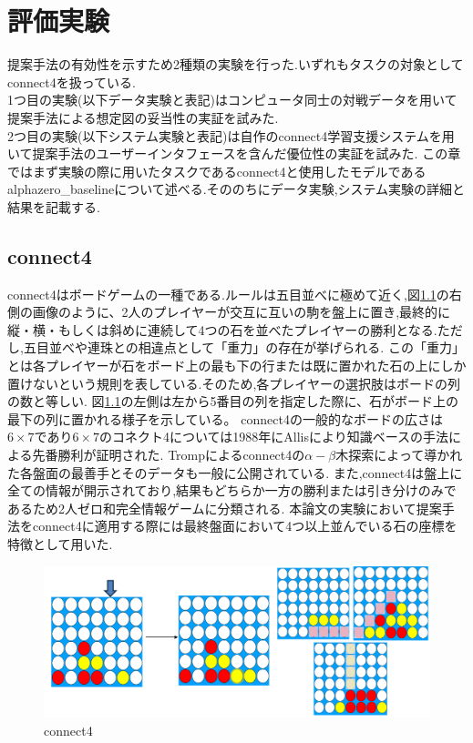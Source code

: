 \chapter{評価実験}
提案手法の有効性を示すため2種類の実験を行った.いずれもタスクの対象としてconnect4を扱っている.\\
1つ目の実験(以下データ実験と表記)はコンピュータ同士の対戦データを用いて提案手法による想定図の妥当性の実証を試みた.\\
2つ目の実験(以下システム実験と表記)は自作のconnect4学習支援システムを用いて提案手法のユーザーインタフェースを含んだ優位性の実証を試みた.
この章ではまず実験の際に用いたタスクであるconnect4と使用したモデルであるalphazero\_baselineについて述べる.そののちにデータ実験,システム実験の詳細と結果を記載する.
\section{connect4}
connect4\cite{connect4}はボードゲームの一種である.ルールは五目並べに極めて近く,図\ref{fig:connect4}の右側の画像のように、2人のプレイヤーが交互に互いの駒を盤上に置き,最終的に縦・横・もしくは斜めに連続して4つの石を並べたプレイヤーの勝利となる.ただし,五目並べや連珠との相違点として「重力」の存在が挙げられる.
この「重力」とは各プレイヤーが石をボード上の最も下の行または既に置かれた石の上にしか置けないという規則を表している.そのため,各プレイヤーの選択肢はボードの列の数と等しい.
図\ref{fig:connect4}の左側は左から5番目の列を指定した際に、石がボード上の最下の列に置かれる様子を示している。
connect4の一般的なボードの広さは$6\times7$であり$6\times7$のコネクト4については1988年にAllis\cite{allis}により知識ベースの手法による先番勝利が証明された.
Tromp\cite{data}によるconnect4の$\alpha-\beta$木探索によって導かれた各盤面の最善手とそのデータも一般に公開されている.
また,connect4は盤上に全ての情報が開示されており,結果もどちらか一方の勝利または引き分けのみであるため2人ゼロ和完全情報ゲームに分類される.
本論文の実験において提案手法をconnect4に適用する際には最終盤面において4つ以上並んでいる石の座標を特徴として用いた.
\begin{figure}[t]
	\centering
    \includegraphics[width=\linewidth]{./figure/connect4.png}
	\caption{connect4}
	\label{fig:connect4}
\end{figure}
